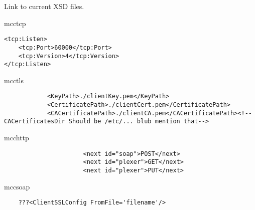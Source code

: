 
Link to current XSD files.

    mcctcp\\
\begin{verbatim}
<tcp:Listen>
	<tcp:Port>60000</tcp:Port>
	<tcp:Version>4</tcp:Version>
</tcp:Listen>
\end{verbatim}
    mcctls\\
\begin{verbatim}
 			<KeyPath>./clientKey.pem</KeyPath>
			<CertificatePath>./clientCert.pem</CertificatePath>
			<CACertificatePath>./clientCA.pem</CACertificatePath><!-- CACertificatesDir Should be /etc/... blub mention that-->

\end{verbatim}

    mcchttp\\
\begin{verbatim}
                      <next id="soap">POST</next>
                      <next id="plexer">GET</next>
                      <next id="plexer">PUT</next>
\end{verbatim}
    mccsoap\\
\begin{verbatim}
	???<ClientSSLConfig FromFile='filename'/>  
\end{verbatim}


